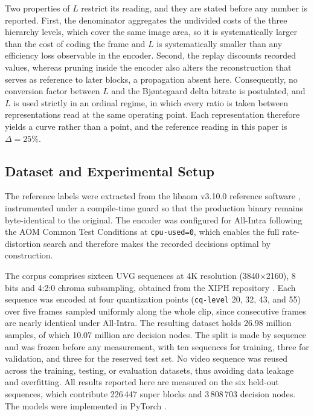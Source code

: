 \documentclass[conference]{IEEEtran}
\begin{document}
Two properties of $L$ restrict its reading, and they are stated before any number
is reported. First, the denominator aggregates the undivided costs of the three
hierarchy levels, which cover the same image area, so it is systematically larger
than the cost of coding the frame and $L$ is systematically smaller than any
efficiency loss observable in the encoder. Second, the replay discounts recorded
values, whereas pruning inside the encoder also alters the reconstruction that
serves as reference to later blocks, a propagation absent here. Consequently, no
conversion factor between $L$ and the Bj\o ntegaard delta bitrate
\cite{bjontegaard} is postulated, and $L$ is used strictly in an ordinal regime,
in which every ratio is taken between representations read at the same operating
point. Each representation therefore yields a curve rather than a point, and the
reference reading in this paper is $\Delta = 25\%$.

\subsection{Dataset and Experimental Setup}

The reference labels were extracted from the libaom v3.10.0 reference software
\cite{libaom}, instrumented under a compile-time guard so that the production
binary remains byte-identical to the original. The encoder was configured for
All-Intra following the AOM Common Test Conditions \cite{ctc} at
\texttt{cpu-used=0}, which enables the full rate-distortion search and therefore
makes the recorded decisions optimal by construction.

The corpus comprises sixteen UVG sequences \cite{uvg} at 4K resolution
(3840$\times$2160), 8 bits and 4:2:0 chroma subsampling, obtained from the XIPH
repository \cite{xipha1}. Each sequence was encoded at four quantization points
(\texttt{cq-level} 20, 32, 43, and 55) over five frames sampled uniformly along
the whole clip, since consecutive frames are nearly identical under All-Intra. The
resulting dataset holds 26.98 million samples, of which 10.07 million are decision
nodes. The split is made by sequence and was frozen before any measurement, with
ten sequences for training, three for validation, and three for the reserved test
set. No video
sequence was reused across the training, testing, or evaluation datasets, thus
avoiding data leakage and overfitting. All results reported here are measured on
the six held-out sequences, which contribute 226\,447 super blocks and
3\,808\,703 decision nodes. The models were implemented in PyTorch \cite{pytorch}.
\end{document}
